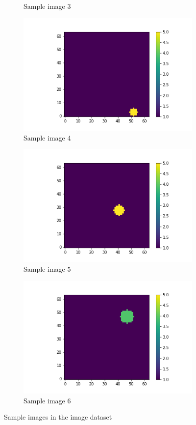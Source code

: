 \documentclass{article}
\begin{document}
\begin{figure}
\begin{subfigure}[b]{0.45\textwidth}
    \caption{Sample image 3}
  \end{subfigure}
  \begin{subfigure}[b]{0.45\textwidth}
    \centering
    \includegraphics[totalheight=4cm]{circle_id/sample3.png}
    \caption{Sample image 4}
  \end{subfigure}
  \begin{subfigure}[b]{0.45\textwidth}
    \centering
    \includegraphics[totalheight=4cm]{circle_id/sample4.png}
    \caption{Sample image 5}
  \end{subfigure}
  \begin{subfigure}[b]{0.45\textwidth}
    \centering
    \includegraphics[totalheight=4cm]{circle_id/sample5.png}
    \caption{Sample image 6}
  \end{subfigure}
\caption{\label{fig:sampleimages} Sample images in the image dataset}
\end{figure}
%
\end{document}
